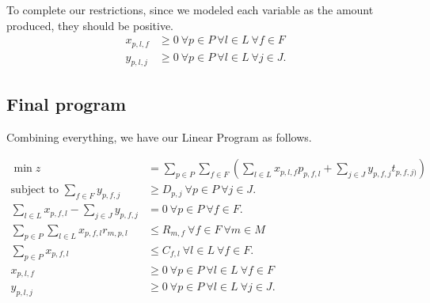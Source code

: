 \documentclass[11pt]{article}
\theoremstyle{definition}
\theoremstyle{definition}
\theoremstyle{remark}
\theoremstyle{remark}
\theoremstyle{remark}
\theoremstyle{remark}
\theoremstyle{definition}
\begin{document}
To complete our restrictions, since we modeled each variable as the amount produced, they should be positive.
\begin{align*}
x_{p,l,f} &\geq 0 \ \forall p \in P \ \forall l \in L \ \forall f \in F \\
y_{p,l,j} &\geq 0 \ \forall p \in P \ \forall l \in L \ \forall j \in J.
\end{align*}
\subsection*{Final program}
\label{sec:org8288e0d}
Combining everything, we have our Linear Program as follows.


\begin{align*}
\min z &= \sum \limits_{p \in P} \sum_{f \in F} (\sum \limits_{l \in L} x_{p,l,f}p_{p,f,l} + \sum_{j \in J} y_{p,f,j}t_{p,f,j)}) \\
\text{subject to } \sum_{f \in F} y_{p,f,j} &\geq D_{p,j} \ \forall p \in P \ \forall j \in J. \\
\sum \limits_{l \in L} x_{p,f,l} - \sum_{j \in J} y_{p,f,j} &= 0 \ \forall p \in P \ \forall f \in F . \\
\sum \limits_{p \in P} \sum \limits_{l \in L} x_{p,f,l}r_{m,p,l} &\leq R_{m,f} \ \forall f \in F \ \forall m \in M \\
\sum_{p \in P} x_{p,f,l} &\leq C_{f,l} \ \forall l \in L \ \forall f \in F. \\
x_{p,l,f} &\geq 0 \ \forall p \in P \ \forall l \in L \ \forall f \in F \\
y_{p,l,j} &\geq 0 \ \forall p \in P \ \forall l \in L \ \forall j \in J.
\end{align*}
\end{document}
